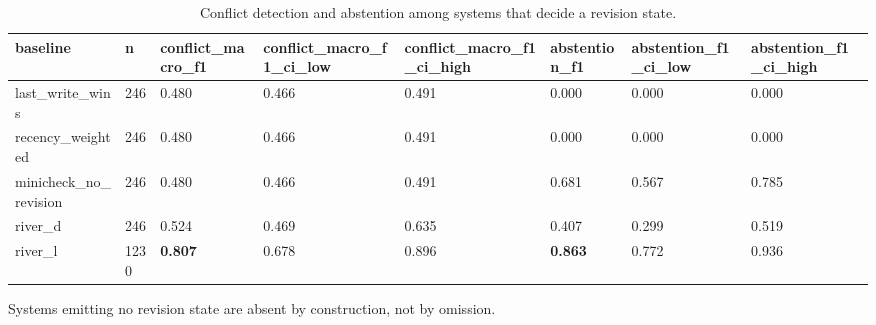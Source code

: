 \begin{table}
\centering
\caption{Conflict detection and abstention among systems that decide a revision state.}
\begin{tabular}{llllllll}
baseline & n & conflict\_macro\_f1 & conflict\_macro\_f1\_ci\_low & conflict\_macro\_f1\_ci\_high & abstention\_f1 & abstention\_f1\_ci\_low & abstention\_f1\_ci\_high \\ \hline
last\_write\_wins & 246 & 0.480 & 0.466 & 0.491 & 0.000 & 0.000 & 0.000 \\
recency\_weighted & 246 & 0.480 & 0.466 & 0.491 & 0.000 & 0.000 & 0.000 \\
minicheck\_no\_revision & 246 & 0.480 & 0.466 & 0.491 & 0.681 & 0.567 & 0.785 \\
river\_d & 246 & 0.524 & 0.469 & 0.635 & 0.407 & 0.299 & 0.519 \\
river\_l & 1230 & \textbf{0.807} & 0.678 & 0.896 & \textbf{0.863} & 0.772 & 0.936 \\
\end{tabular}
\footnotesize{Systems emitting no revision state are absent by construction, not by omission.}
\end{table}
